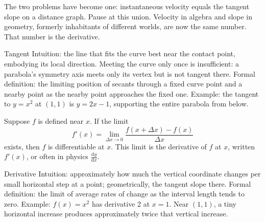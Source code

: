 \begin{center}
\end{center}

The two problems have become one: instantaneous velocity equals the tangent slope on a distance graph. Pause at this union. Velocity in algebra and slope in geometry, formerly inhabitants of different worlds, are now the same number. That number is the derivative.

\begin{shuyu}{Tangent}
Intuition: the line that fits the curve best near the contact point, embodying its local direction. Meeting the curve only once is insufficient: a parabola's symmetry axis meets only its vertex but is not tangent there.
Formal definition: the limiting position of secants through a fixed curve point and a nearby point as the nearby point approaches the fixed one.
Example: the tangent to $y=x^2$ at $(1,1)$ is $y=2x-1$, supporting the entire parabola from below.
\end{shuyu}

\begin{dingyi}[Derivative]
Suppose $f$ is defined near $x$. If the limit
\[
f'(x)=\lim_{\Delta x\to 0}\frac{f(x+\Delta x)-f(x)}{\Delta x}
\]
exists, then $f$ is differentiable at $x$. This limit is the derivative of $f$ at $x$, written $f'(x)$, or often in physics $\frac{\mathrm{d}y}{\mathrm{d}x}$.
\end{dingyi}

\begin{shuyu}{Derivative}
Intuition: approximately how much the vertical coordinate changes per small horizontal step at a point; geometrically, the tangent slope there.
Formal definition: the limit of average rates of change as the interval length tends to zero.
Example: $f(x)=x^2$ has derivative 2 at $x=1$. Near $(1,1)$, a tiny horizontal increase produces approximately twice that vertical increase.
\end{shuyu}

